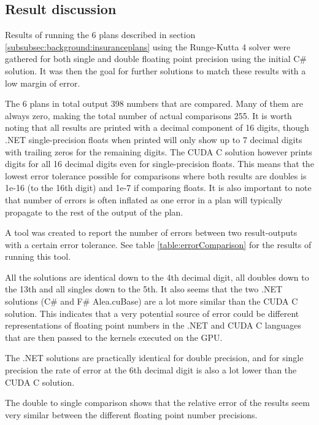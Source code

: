 \subsection{Result discussion}\label{subsec:result_comparison}
Results of running the 6 plans described in section \ref{subsubsec:background:insuranceplans} using the Runge-Kutta 4 solver were gathered for both single and double floating point precision using the initial C\# solution.
It was then the goal for further solutions to match these results with a low margin of error.

The 6 plans in total output 398 numbers that are compared. 
Many of them are always zero, making the total number of actual comparisons 255.
It is worth noting that all results are printed with a decimal component of 16 digits, though .NET single-precision floats when printed will only show up to 7 decimal digits with trailing zeros for the remaining digits.
The CUDA C solution however prints digits for all 16 decimal digits even for single-precision floats.
This means that the lowest error tolerance possible for comparisons where both results are doubles is 1e-16 (to the 16th digit) and 1e-7 if comparing floats.
It is also important to note that number of errors is often inflated as one error in a plan will typically propagate to the rest of the output of the plan.

A tool was created to report the number of errors between two result-outputs with a certain error tolerance.
See table \ref{table:errorComparison} for the results of running this tool.

All the solutions are identical down to the 4th decimal digit, all doubles down to the 13th and all singles down to the 5th.
It also seems that the two .NET solutions (C\# and F\# Alea.cuBase) are a lot more similar than the CUDA C solution.
This indicates that a very potential source of error could be different representations of floating point numbers in the .NET and CUDA C languages that are then passed to the kernels executed on the GPU.

The .NET solutions are practically identical for double precision, and for single precision the rate of error at the 6th decimal digit is also a lot lower than the CUDA C solution.

The double to single comparison shows that the relative error of the results seem very similar between the different floating point number precisions.


